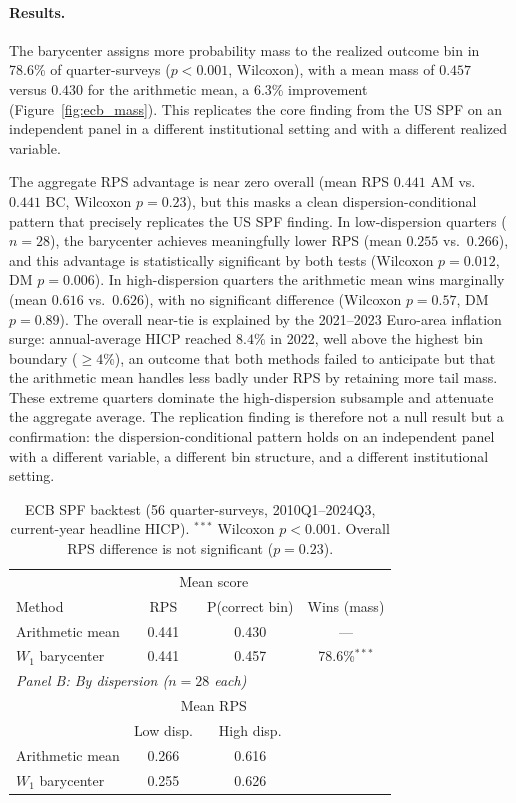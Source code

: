 \paragraph{Results.}  The barycenter assigns more probability mass to the realized outcome bin in 78.6\% of quarter-surveys ($p<0.001$, Wilcoxon), with a mean mass of $0.457$ versus $0.430$ for the arithmetic mean, a 6.3\% improvement (Figure~\ref{fig:ecb_mass}).  This replicates the core finding from the US SPF on an independent panel in a different institutional setting and with a different realized variable.

The aggregate RPS advantage is near zero overall (mean RPS $0.441$ AM vs.\ $0.441$ BC, Wilcoxon $p=0.23$), but this masks a clean dispersion-conditional pattern that precisely replicates the US SPF finding.  In low-dispersion quarters ($n=28$), the barycenter achieves meaningfully lower RPS (mean $0.255$ vs.\ $0.266$), and this advantage is statistically significant by both tests (Wilcoxon $p=0.012$, DM $p=0.006$).  In high-dispersion quarters the arithmetic mean wins marginally (mean $0.616$ vs.\ $0.626$), with no significant difference (Wilcoxon $p=0.57$, DM $p=0.89$).  The overall near-tie is explained by the 2021--2023 Euro-area inflation surge: annual-average HICP reached $8.4\%$ in 2022, well above the highest bin boundary (${\geq}4\%$), an outcome that both methods failed to anticipate but that the arithmetic mean handles less badly under RPS by retaining more tail mass.  These extreme quarters dominate the high-dispersion subsample and attenuate the aggregate average.  The replication finding is therefore not a null result but a confirmation: the dispersion-conditional pattern holds on an independent panel with a different variable, a different bin structure, and a different institutional setting.

\begin{table}[ht]
\centering
\small
\begin{tabular}{lccc}
\hline
 & \multicolumn{2}{c}{Mean score} & \\
Method & RPS & P(correct bin) & Wins (mass) \\
\hline
Arithmetic mean & 0.441 & 0.430 & --- \\
$W_1$ barycenter & 0.441 & 0.457 & 78.6\%$^{***}$ \\
\hline
\multicolumn{4}{l}{\textit{Panel B: By dispersion ($n=28$ each)}} \\[2pt]
\hline
 & \multicolumn{2}{c}{Mean RPS} & \\
 & Low disp. & High disp. & \\
\hline
Arithmetic mean & 0.266 & 0.616 & \\
$W_1$ barycenter & 0.255 & 0.626 & \\
\hline
\end{tabular}
\caption{ECB SPF backtest (56 quarter-surveys, 2010Q1--2024Q3, current-year headline HICP).  $^{***}$ Wilcoxon $p<0.001$.  Overall RPS difference is not significant ($p=0.23$).}
\label{tab:ecb_backtest}
\end{table}


